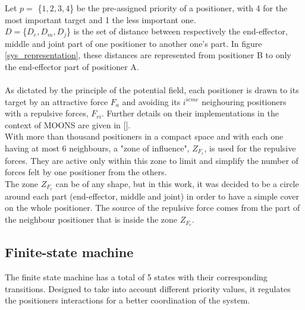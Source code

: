 \documentclass[]{spie}  %
\begin{document}
	Let $p =$ \{$1,2,3,4$\} be the pre-assigned priority of a positioner, with 4 for the most important target and 1 the less important one. \\
	$D=$\{$D_e, D_m, D_j$\} is the set of distance between respectively the end-effector, middle and joint part of one positioner to another one's part. In figure \ref{sys_representation}, these distances are represented from positioner B to only the end-effector part of positioner A.\\\\
	As dictated by the principle of the potential field, each positioner is drawn to its target by an attractive force $F_a$ and avoiding its $i^{ieme}$ neighouring positioners with a repulsive forces, $F_{ri}$. Further details on their implementations in the context of MOONS are given in []. \\
	 With more than thousand positioners in a compact space and with each one having at most 6 neighbours, a "zone of influence", $Z_{F_{r}}$, is used for the repulsive forces. They are active only within this zone to limit and simplify the number of forces felt by one positioner from the others.\\ 
	 The zone $Z_{F_{r}}$ can be of any shape, but in this work, it was decided to be a circle around each part (end-effector, middle and joint) in order to have a simple cover on the whole positioner. The source of the repulsive force comes from the part of the neighbour positioner that is inside the zone $Z_{F_{r}}$.\\
	 
	\subsection{Finite-state machine}	
	
	The finite state machine has a total of 5 states with their corresponding transitions. Designed to take into account different priority values, it regulates the positioners interactions for a better coordination of the system.
\end{document}
